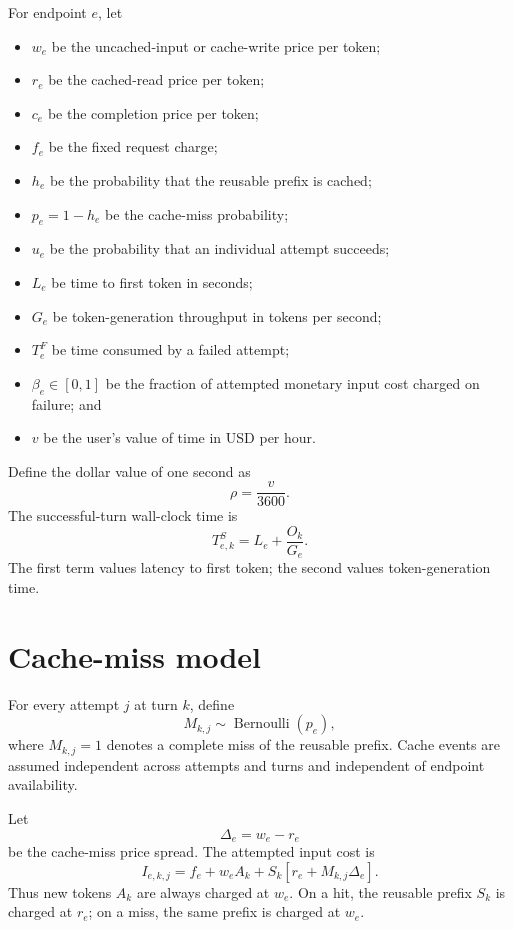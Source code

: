 \documentclass[11pt]{article}
\begin{document}
For endpoint $e$, let
\begin{itemize}[nosep]
  \item $w_e$ be the uncached-input or cache-write price per token;
  \item $r_e$ be the cached-read price per token;
  \item $c_e$ be the completion price per token;
  \item $f_e$ be the fixed request charge;
  \item $h_e$ be the probability that the reusable prefix is cached;
  \item $p_e=1-h_e$ be the cache-miss probability;
  \item $u_e$ be the probability that an individual attempt succeeds;
  \item $L_e$ be time to first token in seconds;
  \item $G_e$ be token-generation throughput in tokens per second;
  \item $T_e^F$ be time consumed by a failed attempt;
  \item $\beta_e\in[0,1]$ be the fraction of attempted monetary input cost charged
        on failure; and
  \item $v$ be the user's value of time in USD per hour.
\end{itemize}

Define the dollar value of one second as
\begin{equation}
\rho=\frac{v}{3600}.
\end{equation}
The successful-turn wall-clock time is
\begin{equation}
T_{e,k}^S=L_e+\frac{O_k}{G_e}.
\end{equation}
The first term values latency to first token; the second values token-generation
time.

\section{Cache-miss model}

For every attempt $j$ at turn $k$, define
\begin{equation}
M_{k,j}\sim\operatorname{Bernoulli}(p_e),
\end{equation}
where $M_{k,j}=1$ denotes a complete miss of the reusable prefix. Cache events
are assumed independent across attempts and turns and independent of endpoint
availability.

Let
\begin{equation}
\Delta_e=w_e-r_e
\end{equation}
be the cache-miss price spread. The attempted input cost is
\begin{equation}
I_{e,k,j}
=f_e+w_eA_k+S_k\left[r_e+M_{k,j}\Delta_e\right].
\end{equation}
Thus new tokens $A_k$ are always charged at $w_e$. On a hit, the reusable
prefix $S_k$ is charged at $r_e$; on a miss, the same prefix is charged at
$w_e$.
\end{document}
